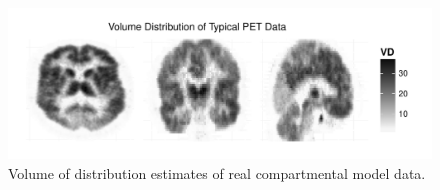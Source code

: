 \begin{figure}[t]
  \UseAltLinespread
  \includegraphics[width=\linewidth]{fig_src/PETPlot-smc2-ps-bw}
  \caption{Volume of distribution estimates of real \protect\pet
   compartmental model data.}
  \label{fig:petplot}
\end{figure}

